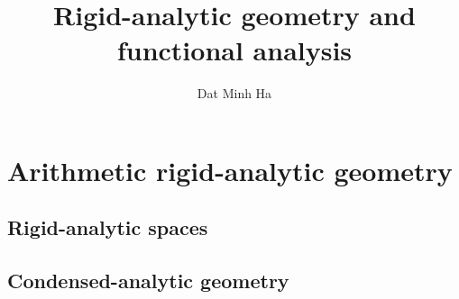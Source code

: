 

\setcounter{chapter}{-1}




    \title{Rigid-analytic geometry and functional analysis}
    
    \author{Dat Minh Ha}
    \maketitle
    
    \begin{abstract}
        
    \end{abstract}
    
    {
      \hypersetup{} 
      \dominitoc
      \tableofcontents %
    }
    
    

    \part{Arithmetic rigid-analytic geometry}
        \chapter{Rigid-analytic spaces}
            \begin{abstract}
                
            \end{abstract}
            
            \minitoc
            
            
            
            
            
            
            
        \chapter{Condensed-analytic geometry}
            \begin{abstract}
                
            \end{abstract}
            
            \minitoc
            
